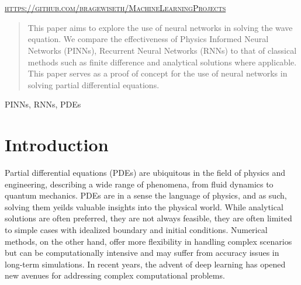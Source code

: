 \documentclass[twoside,11pt]{report}
\begin{document}
\begin{titlepage}
\begin{minipage}{0.4\textwidth}
    \end{minipage}\\[2 cm]
    \@date\\
    \vspace*{25mm}
    \textsc{\url{https://github.com/bragewiseth/MachineLearningProjects}}







\end{titlepage}
\nocite{*}
\newpage
\tableofcontents
\newpage




\begin{abstract}%
    \lettrine{T}{}his paper aims to explore the use of neural networks in solving the wave equation.
    We compare the effectiveness of Physics Informed Neural Networks (PINNs), Recurrent Neural Networks (RNNs) 
    to that of classical methods such as finite difference and analytical solutions where applicable.
    This paper serves as a proof of concept for the use of neural networks in solving partial differential equations.
\end{abstract}
\begin{keywords}
    PINNs, RNNs, PDEs 
\end{keywords}





\section*{Introduction}

    Partial differential equations (PDEs) are ubiquitous in the field of physics and engineering,
    describing a wide range of phenomena, from fluid dynamics to quantum mechanics.
    PDEs are in a sense the language of physics, and as such, solving them yeilds valuable insights into
    the physical world. While analytical solutions are often preferred, they are not always feasible,
    they are often limited to simple cases with idealized boundary and initial conditions. Numerical methods, 
    on the other hand, offer more flexibility in handling complex scenarios but can be computationally 
    intensive and may suffer from accuracy issues in long-term simulations. In recent years, the advent 
    of deep learning has opened new avenues for addressing complex computational problems.
\end{document}
